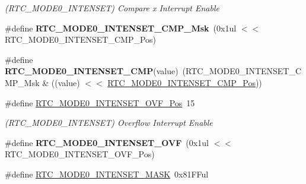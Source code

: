 \begin{DoxyCompactItemize}
\begin{DoxyCompactList}\small\item\em (R\+T\+C\+\_\+\+M\+O\+D\+E0\+\_\+\+I\+N\+T\+E\+N\+S\+E\+T) Compare x Interrupt Enable \end{DoxyCompactList}\item 
\hypertarget{group___s_a_m_l21___r_t_c_gadb7a972905c2e549aaff1355358b66ae}{}\#define {\bfseries R\+T\+C\+\_\+\+M\+O\+D\+E0\+\_\+\+I\+N\+T\+E\+N\+S\+E\+T\+\_\+\+C\+M\+P\+\_\+\+Msk}~(0x1ul $<$$<$ R\+T\+C\+\_\+\+M\+O\+D\+E0\+\_\+\+I\+N\+T\+E\+N\+S\+E\+T\+\_\+\+C\+M\+P\+\_\+\+Pos)\label{group___s_a_m_l21___r_t_c_gadb7a972905c2e549aaff1355358b66ae}

\item 
\hypertarget{group___s_a_m_l21___r_t_c_gabf27c28f941fc2a7a091ed7ee0418fda}{}\#define {\bfseries R\+T\+C\+\_\+\+M\+O\+D\+E0\+\_\+\+I\+N\+T\+E\+N\+S\+E\+T\+\_\+\+C\+M\+P}(value)~(R\+T\+C\+\_\+\+M\+O\+D\+E0\+\_\+\+I\+N\+T\+E\+N\+S\+E\+T\+\_\+\+C\+M\+P\+\_\+\+Msk \& ((value) $<$$<$ \hyperlink{group___s_a_m_l21___r_t_c_gaac99a4ba6781229ea22960ac65244ace}{R\+T\+C\+\_\+\+M\+O\+D\+E0\+\_\+\+I\+N\+T\+E\+N\+S\+E\+T\+\_\+\+C\+M\+P\+\_\+\+Pos}))\label{group___s_a_m_l21___r_t_c_gabf27c28f941fc2a7a091ed7ee0418fda}

\item 
\hypertarget{group___s_a_m_l21___r_t_c_ga7404b7db124a4b476c6c170a51fc9bc8}{}\#define \hyperlink{group___s_a_m_l21___r_t_c_ga7404b7db124a4b476c6c170a51fc9bc8}{R\+T\+C\+\_\+\+M\+O\+D\+E0\+\_\+\+I\+N\+T\+E\+N\+S\+E\+T\+\_\+\+O\+V\+F\+\_\+\+Pos}~15\label{group___s_a_m_l21___r_t_c_ga7404b7db124a4b476c6c170a51fc9bc8}

\begin{DoxyCompactList}\small\item\em (R\+T\+C\+\_\+\+M\+O\+D\+E0\+\_\+\+I\+N\+T\+E\+N\+S\+E\+T) Overflow Interrupt Enable \end{DoxyCompactList}\item 
\hypertarget{group___s_a_m_l21___r_t_c_ga41532fa54cae21c815d8486edb420f47}{}\#define {\bfseries R\+T\+C\+\_\+\+M\+O\+D\+E0\+\_\+\+I\+N\+T\+E\+N\+S\+E\+T\+\_\+\+O\+V\+F}~(0x1ul $<$$<$ R\+T\+C\+\_\+\+M\+O\+D\+E0\+\_\+\+I\+N\+T\+E\+N\+S\+E\+T\+\_\+\+O\+V\+F\+\_\+\+Pos)\label{group___s_a_m_l21___r_t_c_ga41532fa54cae21c815d8486edb420f47}

\item 
\hypertarget{group___s_a_m_l21___r_t_c_gaea3da451809cab6b3b3e214185c695b8}{}\#define \hyperlink{group___s_a_m_l21___r_t_c_gaea3da451809cab6b3b3e214185c695b8}{R\+T\+C\+\_\+\+M\+O\+D\+E0\+\_\+\+I\+N\+T\+E\+N\+S\+E\+T\+\_\+\+M\+A\+S\+K}~0x81\+F\+Ful\label{group___s_a_m_l21___r_t_c_gaea3da451809cab6b3b3e214185c695b8}


\end{DoxyCompactItemize}
